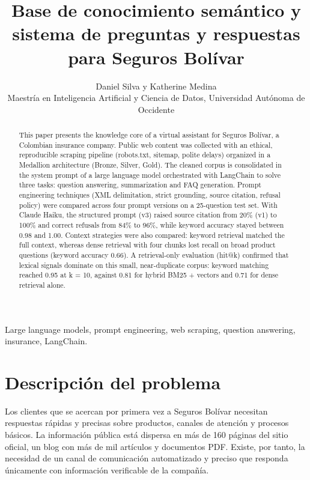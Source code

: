 \documentclass[journal]{IEEEtran}
\begin{document}
\title{Base de conocimiento semántico y sistema de preguntas y respuestas para Seguros Bolívar}

\author{Daniel Silva y Katherine Medina\\
Maestría en Inteligencia Artificial y Ciencia de Datos, Universidad Autónoma de Occidente}
\maketitle

\begin{abstract}
This paper presents the knowledge core of a virtual assistant for Seguros Bolívar, a Colombian insurance company. Public web content was collected with an ethical, reproducible scraping pipeline (robots.txt, sitemap, polite delays) organized in a Medallion architecture (Bronze, Silver, Gold). The cleaned corpus is consolidated in the system prompt of a large language model orchestrated with LangChain to solve three tasks: question answering, summarization and FAQ generation. Prompt engineering techniques (XML delimitation, strict grounding, source citation, refusal policy) were compared across four prompt versions on a 25-question test set. With Claude Haiku, the structured prompt (v3) raised source citation from 20\% (v1) to 100\% and correct refusals from 84\% to 96\%, while keyword accuracy stayed between 0.98 and 1.00. Context strategies were also compared: keyword retrieval matched the full context, whereas dense retrieval with four chunks lost recall on broad product questions (keyword accuracy 0.66). A retrieval-only evaluation (hit@k) confirmed that lexical signals dominate on this small, near-duplicate corpus: keyword matching reached 0.95 at k = 10, against 0.81 for hybrid BM25 + vectors and 0.71 for dense retrieval alone.
\end{abstract}

\begin{IEEEkeywords}
Large language models, prompt engineering, web scraping, question answering, insurance, LangChain.
\end{IEEEkeywords}
\IEEEpeerreviewmaketitle

\section{Descripción del problema}
Los clientes que se acercan por primera vez a Seguros Bolívar necesitan respuestas rápidas y precisas sobre productos, canales de atención y procesos básicos. La información pública está dispersa en más de 160 páginas del sitio oficial, un blog con más de mil artículos y documentos PDF. Existe, por tanto, la necesidad de un canal de comunicación automatizado y preciso que responda únicamente con información verificable de la compañía.
\end{document}
